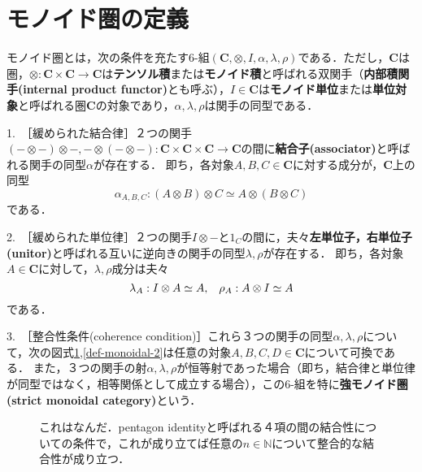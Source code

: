 \documentclass[uplatex, 12pt, dvipdfmx]{jsreport}
\begin{document}
\section{モノイド圏の定義}
\begin{definition}\rm{}
    モノイド圏とは，次の条件を充たす6-組$(\mathbf{C},\otimes,I,\alpha,\lambda,\rho)$である．ただし，$\mathbf{C}$は圏，$\otimes:\mathbf{C}\times \mathbf{C}\to \mathbf{C}$は\textbf{テンソル積}または\textbf{モノイド積}と呼ばれる双関手（\textbf{内部積関手(internal product functor)}とも呼ぶ），$I\in \mathbf{C}$は\textbf{モノイド単位}または\textbf{単位対象}と呼ばれる圏$\mathbf{C}$の対象であり，$\alpha,\lambda,\rho$は関手の同型である．

    1.\, ［緩められた結合律］２つの関手$(-\otimes -)\otimes -,-\otimes (-\otimes -):\mathbf{C}\times \mathbf{C}\times \mathbf{C}\to \mathbf{C}$の間に\textbf{結合子(associator)}と呼ばれる関手の同型$\alpha$が存在する．
    即ち，各対象$A,B,C\in\mathbf{C}$に対する成分が，$\mathbf{C}$上の同型$$\alpha_{A,B,C}:(A\otimes B)\otimes C\simeq A\otimes (B\otimes C)$$である．

    2.\, ［緩められた単位律］２つの関手$I\otimes -$と$1_C$の間に，夫々\textbf{左単位子，右単位子(unitor)}と呼ばれる互いに逆向きの関手の同型$\lambda,\rho$が存在する．
    即ち，各対象$A\in\mathbf{C}$に対して，$\lambda,\rho$成分は夫々$$\lambda_A:I\otimes A\simeq A,\hspace{3mm}\rho_A:A\otimes I\simeq A$$である．

    3.\, ［整合性条件(coherence condition)］これら３つの関手の同型$\alpha,\lambda,\rho$について，次の図式\ref{def-monoidal-1},\ref{def-monoidal-2}は任意の対象$A,B,C,D\in\mathbf{C}$について可換である．
    また，３つの関手の射$\alpha,\lambda,\rho$が恒等射であった場合（即ち，結合律と単位律が同型ではなく，相等関係として成立する場合），この6-組を特に\textbf{強モノイド圏(strict monoidal category)}という．
\end{definition}
\begin{figure}[h]\begin{center}\caption{これはなんだ．pentagon identityと呼ばれる４項の間の結合性についての条件で，これが成り立てば任意の$n\in\mathbb{N}$について整合的な結合性が成り立つ．\label{def-monoidal-1}}
\end{center}\end{figure}
\end{document}
